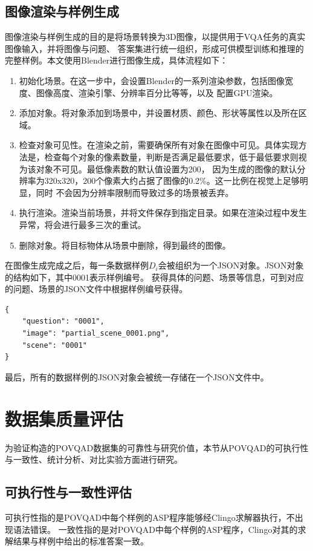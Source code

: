\subsection{图像渲染与样例生成}
图像渲染与样例生成的目的是将场景转换为3D图像，以提供用于VQA任务的真实图像输入，并将图像与问题、
答案集进行统一组织，形成可供模型训练和推理的完整样例。本文使用Blender进行图像生成，具体流程如下：
\begin{enumerate}[nosep]
\item 初始化场景。在这一步中，会设置Blender的一系列渲染参数，包括图像宽度、图像高度、渲染引擎、分辨率百分比等等，以及
配置GPU渲染。
\item 添加对象。将对象添加到场景中，并设置材质、颜色、形状等属性以及所在区域。
\item 检查对象可见性。在渲染之前，需要确保所有对象在图像中可见。具体实现方法是，检查每个对象的像素数量，判断是否满足最低要求，低于最低要求则视为该对象不可见。最低像素数的默认值设置为200，
因为生成的图像的默认分辨率为320x320，200个像素大约占据了图像的0.2\%。这一比例在视觉上足够明显，同时
不会因为分辨率限制而导致过多的场景被丢弃。
\item 执行渲染。渲染当前场景，并将文件保存到指定目录。如果在渲染过程中发生异常，将会进行最多三次的重试。
\item 删除对象。将目标物体从场景中删除，得到最终的图像。
\end{enumerate}

在图像生成完成之后，每一条数据样例$D_i$会被组织为一个JSON对象。JSON对象的结构如下，其中0001表示样例编号。
获得具体的问题、场景等信息，可到对应的问题、场景的JSON文件中根据样例编号获得。
\begin{lstlisting}
{
    "question": "0001",
    "image": "partial_scene_0001.png",
    "scene": "0001"
}
\end{lstlisting}

最后，所有的数据样例的JSON对象会被统一存储在一个JSON文件中。
\section{数据集质量评估}
为验证构造的POVQAD数据集的可靠性与研究价值，本节从POVQAD的可执行性与一致性、统计分析、对比实验方面进行研究。
\subsection{可执行性与一致性评估}
可执行性指的是POVQAD中每个样例的ASP程序能够经Clingo求解器执行，不出现语法错误。
一致性指的是对POVQAD中每个样例的ASP程序，Clingo对其的求解结果与样例中给出的标准答案一致。


